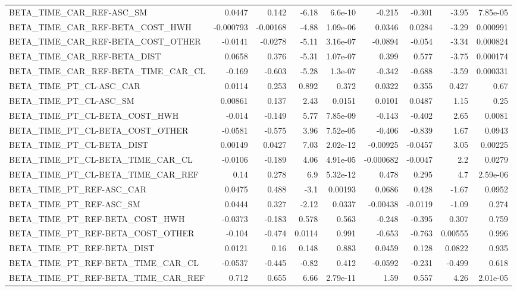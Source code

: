 \begin{tabular}{lrrrrrrrr}
BETA_TIME_CAR_REF-ASC_SM & 0.0447 & 0.142 & -6.18 & 6.6e-10 & -0.215 & -0.301 & -3.95 & 7.85e-05 \\
BETA_TIME_CAR_REF-BETA_COST_HWH & -0.000793 & -0.00168 & -4.88 & 1.09e-06 & 0.0346 & 0.0284 & -3.29 & 0.000991 \\
BETA_TIME_CAR_REF-BETA_COST_OTHER & -0.0141 & -0.0278 & -5.11 & 3.16e-07 & -0.0894 & -0.054 & -3.34 & 0.000824 \\
BETA_TIME_CAR_REF-BETA_DIST & 0.0658 & 0.376 & -5.31 & 1.07e-07 & 0.399 & 0.577 & -3.75 & 0.000174 \\
BETA_TIME_CAR_REF-BETA_TIME_CAR_CL & -0.169 & -0.603 & -5.28 & 1.3e-07 & -0.342 & -0.688 & -3.59 & 0.000331 \\
BETA_TIME_PT_CL-ASC_CAR & 0.0114 & 0.253 & 0.892 & 0.372 & 0.0322 & 0.355 & 0.427 & 0.67 \\
BETA_TIME_PT_CL-ASC_SM & 0.00861 & 0.137 & 2.43 & 0.0151 & 0.0101 & 0.0487 & 1.15 & 0.25 \\
BETA_TIME_PT_CL-BETA_COST_HWH & -0.014 & -0.149 & 5.77 & 7.85e-09 & -0.143 & -0.402 & 2.65 & 0.0081 \\
BETA_TIME_PT_CL-BETA_COST_OTHER & -0.0581 & -0.575 & 3.96 & 7.52e-05 & -0.406 & -0.839 & 1.67 & 0.0943 \\
BETA_TIME_PT_CL-BETA_DIST & 0.00149 & 0.0427 & 7.03 & 2.02e-12 & -0.00925 & -0.0457 & 3.05 & 0.00225 \\
BETA_TIME_PT_CL-BETA_TIME_CAR_CL & -0.0106 & -0.189 & 4.06 & 4.91e-05 & -0.000682 & -0.0047 & 2.2 & 0.0279 \\
BETA_TIME_PT_CL-BETA_TIME_CAR_REF & 0.14 & 0.278 & 6.9 & 5.32e-12 & 0.478 & 0.295 & 4.7 & 2.59e-06 \\
BETA_TIME_PT_REF-ASC_CAR & 0.0475 & 0.488 & -3.1 & 0.00193 & 0.0686 & 0.428 & -1.67 & 0.0952 \\
BETA_TIME_PT_REF-ASC_SM & 0.0444 & 0.327 & -2.12 & 0.0337 & -0.00438 & -0.0119 & -1.09 & 0.274 \\
BETA_TIME_PT_REF-BETA_COST_HWH & -0.0373 & -0.183 & 0.578 & 0.563 & -0.248 & -0.395 & 0.307 & 0.759 \\
BETA_TIME_PT_REF-BETA_COST_OTHER & -0.104 & -0.474 & 0.0114 & 0.991 & -0.653 & -0.763 & 0.00555 & 0.996 \\
BETA_TIME_PT_REF-BETA_DIST & 0.0121 & 0.16 & 0.148 & 0.883 & 0.0459 & 0.128 & 0.0822 & 0.935 \\
BETA_TIME_PT_REF-BETA_TIME_CAR_CL & -0.0537 & -0.445 & -0.82 & 0.412 & -0.0592 & -0.231 & -0.499 & 0.618 \\
BETA_TIME_PT_REF-BETA_TIME_CAR_REF & 0.712 & 0.655 & 6.66 & 2.79e-11 & 1.59 & 0.557 & 4.26 & 2.01e-05 \\

\end{tabular}
